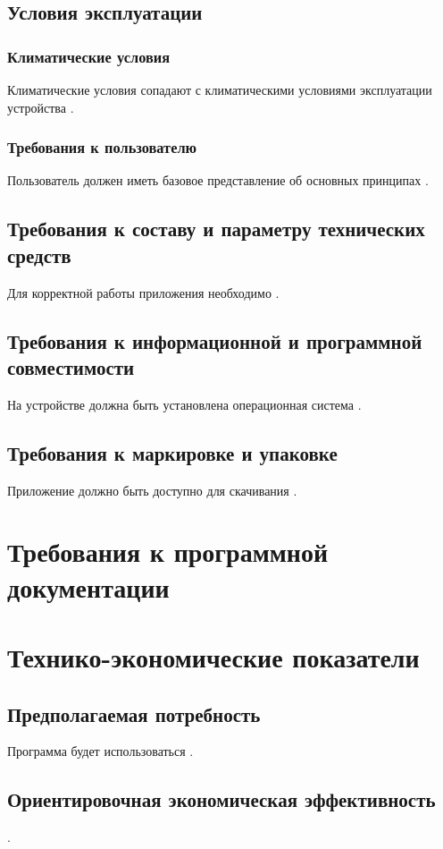 \documentclass[a4paper,12pt,reqno]{article}
\begin{document}
	\subsection{Условия эксплуатации}
	\subsubsection{Климатические условия}
	Климатические условия сопадают с климатическими условиями эксплуатации\\ устройства \cite{terms}.
	\subsubsection{Требования к пользователю}
	Пользователь должен иметь базовое представление об основных принципах {\color{red}{TODO}}.
	\subsection{Требования к составу и параметру технических средств}
	Для корректной работы приложения необходимо {\color{red}{TODO}}.
	\subsection{Требования к информационной и программной совместимости}
	На устройстве должна быть установлена операционная система {\color{red}{TODO}}.
	\subsection{Требования к маркировке и упаковке}
	Приложение должно быть доступно для скачивания {\color{red}{TODO}}.
	
						\newpage
	\section{Требования к программной документации}
	{\color{red}{TODO}}
	
						\newpage
	\section{Технико-экономические показатели}
	\subsection{Предполагаемая потребность}
	Программа будет использоваться {\color{red}{TODO}}.
	
	\subsection{Ориентировочная экономическая эффективность} 
	{\color{red}{TODO}}.
	
\end{document}
